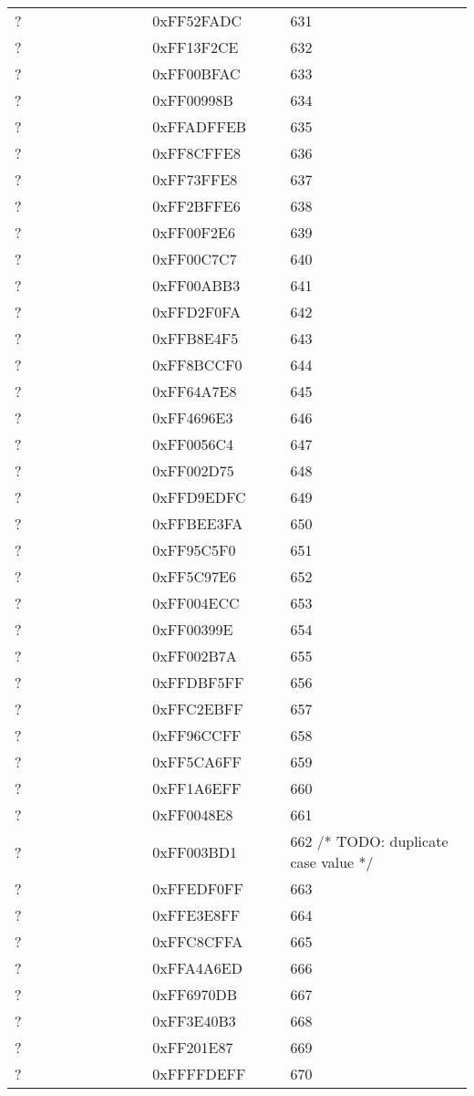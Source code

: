 \begin{longtable}{p{0.3\linewidth} p{0.3\linewidth} p{0.4\linewidth}}
? &  0xFF52FADC &  631\\
? &  0xFF13F2CE &  632\\
? &  0xFF00BFAC &  633\\
? &  0xFF00998B &  634\\
? &  0xFFADFFEB &  635\\
? &  0xFF8CFFE8 &  636\\
? &  0xFF73FFE8 &  637\\
? &  0xFF2BFFE6 &  638\\
? &  0xFF00F2E6 &  639\\
? &  0xFF00C7C7 &  640\\
? &  0xFF00ABB3 &  641\\
? &  0xFFD2F0FA &  642\\
? &  0xFFB8E4F5 &  643\\
? &  0xFF8BCCF0 &  644\\
? &  0xFF64A7E8 &  645\\
? &  0xFF4696E3 &  646\\
? &  0xFF0056C4 &  647\\
? &  0xFF002D75 &  648\\
? &  0xFFD9EDFC &  649\\
? &  0xFFBEE3FA &  650\\
? &  0xFF95C5F0 &  651\\
? &  0xFF5C97E6 &  652\\
? &  0xFF004ECC &  653\\
? &  0xFF00399E &  654\\
? &  0xFF002B7A &  655\\
? &  0xFFDBF5FF &  656\\
? &  0xFFC2EBFF &  657\\
? &  0xFF96CCFF &  658\\
? &  0xFF5CA6FF &  659\\
? &  0xFF1A6EFF &  660\\
? &  0xFF0048E8 &  661\\
? &  0xFF003BD1 &  662 /* TODO: duplicate case value */\\
? &  0xFFEDF0FF &  663\\
? &  0xFFE3E8FF &  664\\
? &  0xFFC8CFFA &  665\\
? &  0xFFA4A6ED &  666\\
? &  0xFF6970DB &  667\\
? &  0xFF3E40B3 &  668\\
? &  0xFF201E87 &  669\\
? &  0xFFFFDEFF &  670\\

\end{longtable}

